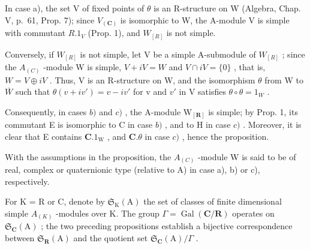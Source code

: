In case a), the set V of fixed points of \(\theta\) is an R-structure on W (Algebra, Chap. V, p.~61, Prop. 7); since \(V_{(\mathbf{C})}\) is isomorphic to W, the A-module V is simple with commutant \(R.1_{V}\) (Prop. 1), and \(W_{[R]}\) is not simple.

Conversely, if \(W_{[R]}\) is not simple, let V be a simple A-submodule of \(W_{[R]}\) ; since the \(A_{(C)}\) -module W is simple, \(V + iV = W\) and \(V \cap iV = \{0\}\) , that is, \(W = V \oplus iV\) . Thus, V is an R-structure on W, and the isomorphism \(\theta\) from W to \(\overline{W}\) such that \(\theta(v + iv') = v - iv'\) for v and \(v'\) in V satisfies \(\theta \circ \theta = 1_{W}\) .

Consequently, in cases \(b)\) and \(c)\) , the A-module \(\mathrm{W}_{[\mathbf{R}]}\) is simple; by Prop. 1, its commutant E is isomorphic to C in case \(b)\) , and to H in case \(c)\) . Moreover, it is clear that E contains \(\mathbf{C}.1_{\mathrm{W}}\) , and \(\mathbf{C}.\theta\) in case \(c)\) , hence the proposition.

With the assumptions in the proposition, the \(A_{(C)}\) -module W is said to be of real, complex or quaternionic type (relative to A) in case a), b) or c), respectively.

For K = R or C, denote by \(\mathfrak{S}_{\mathrm{K}}(\mathrm{A})\) the set of classes of finite dimensional simple \(A_{(K)}\) -modules over K. The group \(\Gamma = \operatorname{Gal}(\mathbf{C}/\mathbf{R})\) operates on \(\mathfrak{S}_{\mathbf{C}}(\mathrm{A})\) ; the two preceding propositions establish a bijective correspondence between \(\mathfrak{S}_{\mathbf{R}}(\mathrm{A})\) and the quotient set \(\mathfrak{S}_{\mathbf{C}}(\mathrm{A})/\Gamma\) .
\relax{}
